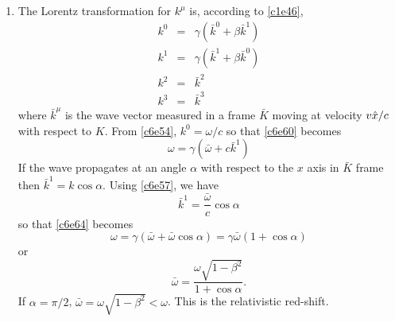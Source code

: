 \begin{enumerate}
\item The Lorentz transformation for $k^\mu$ is, according to \eqref{c1e46},
\begin{eqnarray}
k^0 &=& \gamma(\bar{k}^0 + \beta\bar{k}^1) \label{c6e60} \\
k^1 &=& \gamma(\bar{k}^1 + \beta\bar{k}^0) \label{c6e61} \\
k^2 &=& \bar{k}^2 \label{c6e62} \\
k^3 &=& \bar{k}^3 \label{c6e63}
\end{eqnarray}
where $\bar{k}^\mu$ is the wave vector measured in a frame $\bar{K}$ moving
at velocity $v\hat{x}/c$ with respect to $K$. From \eqref{c6e54}, $k^0 = \omega/c$
so that \eqref{c6e60} becomes
\begin{equation}\label{c6e64}
\omega = \gamma(\bar{\omega} + c\bar{k}^1)
\end{equation}
If the wave propagates at an angle $\alpha$ with respect to the $x$ axis in 
$\bar{K}$ frame then $\bar{k}^1 = k\cos\alpha$. Using \eqref{c6e57}, we have
\begin{equation}\label{c6e65}
\bar{k}^1 = \frac{\bar{\omega}}{c}\cos\alpha
\end{equation}
so that \eqref{c6e64} becomes
\[
\omega = \gamma(\bar{\omega} + \bar{\omega}\cos\alpha) = \gamma\bar{\omega}(1 + \cos\alpha)
\]
or
\begin{equation}\label{c6e66}
\bar{\omega} = \frac{\omega\sqrt{1 - \beta^2}}{1 + \cos\alpha}.
\end{equation}
If $\alpha = \pi/2$, $\bar{\omega} = \omega\sqrt{1 - \beta^2} < \omega$. This is 
the relativistic red-shift.


\end{enumerate}
